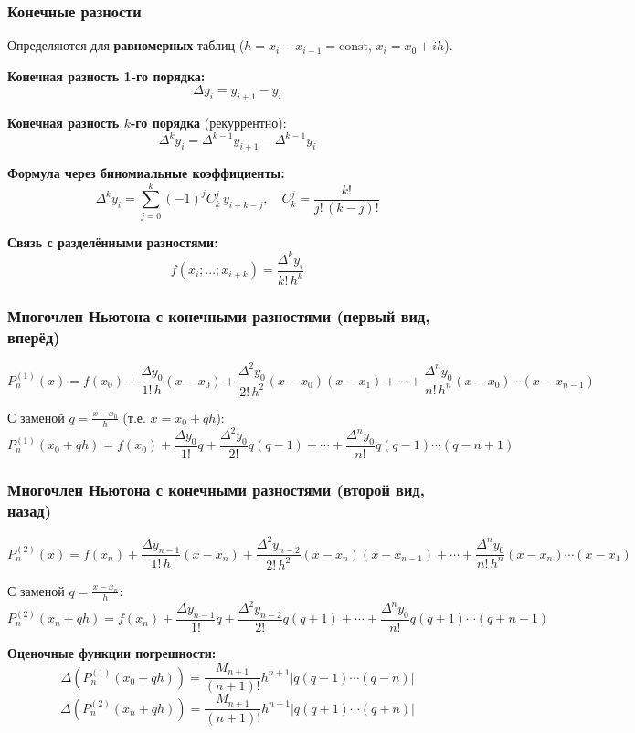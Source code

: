 \documentclass[14pt,a4paper]{extarticle}
\begin{document}
\subsubsection{Конечные разности}

Определяются для \textbf{равномерных} таблиц ($h = x_i - x_{i-1} = \text{const}$, $x_i = x_0 + ih$).

\textbf{Конечная разность 1-го порядка:}
\[\Delta y_i = y_{i+1} - y_i\]

\textbf{Конечная разность $k$-го порядка} (рекуррентно):
\[\Delta^k y_i = \Delta^{k-1} y_{i+1} - \Delta^{k-1} y_i\]

\textbf{Формула через биномиальные коэффициенты:}
\[\Delta^k y_i = \sum_{j=0}^{k} (-1)^j C_k^j \, y_{i+k-j}, \quad C_k^j = \frac{k!}{j!\,(k-j)!}\]

\textbf{Связь с разделёнными разностями:}
\[f(x_i; \ldots; x_{i+k}) = \frac{\Delta^k y_i}{k! \, h^k}\]

\subsubsection{Многочлен Ньютона с конечными разностями (первый вид, вперёд)}

\[P_n^{(1)}(x) = f(x_0) + \frac{\Delta y_0}{1! \, h}(x - x_0) + \frac{\Delta^2 y_0}{2! \, h^2}(x - x_0)(x - x_1) + \cdots + \frac{\Delta^n y_0}{n! \, h^n}(x - x_0)\cdots(x - x_{n-1})\]

С заменой $q = \frac{x - x_0}{h}$ (т.е. $x = x_0 + qh$):
\[P_n^{(1)}(x_0 + qh) = f(x_0) + \frac{\Delta y_0}{1!} q + \frac{\Delta^2 y_0}{2!} q(q-1) + \cdots + \frac{\Delta^n y_0}{n!} q(q-1)\cdots(q-n+1)\]

\subsubsection{Многочлен Ньютона с конечными разностями (второй вид, назад)}

\[P_n^{(2)}(x) = f(x_n) + \frac{\Delta y_{n-1}}{1! \, h}(x - x_n) + \frac{\Delta^2 y_{n-2}}{2! \, h^2}(x - x_n)(x - x_{n-1}) + \cdots + \frac{\Delta^n y_0}{n! \, h^n}(x - x_n)\cdots(x - x_1)\]

С заменой $q = \frac{x - x_n}{h}$:
\[P_n^{(2)}(x_n + qh) = f(x_n) + \frac{\Delta y_{n-1}}{1!} q + \frac{\Delta^2 y_{n-2}}{2!} q(q+1) + \cdots + \frac{\Delta^n y_0}{n!} q(q+1)\cdots(q+n-1)\]

\textbf{Оценочные функции погрешности:}
\[\Delta(P_n^{(1)}(x_0 + qh)) = \frac{M_{n+1}}{(n+1)!} h^{n+1} |q(q-1)\cdots(q-n)|\]
\[\Delta(P_n^{(2)}(x_n + qh)) = \frac{M_{n+1}}{(n+1)!} h^{n+1} |q(q+1)\cdots(q+n)|\]
\end{document}
